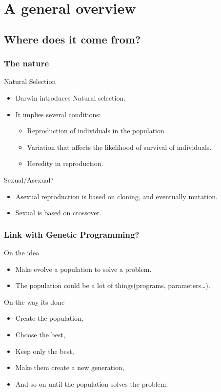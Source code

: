 \section{A general overview}
\subsection{Where does it come from?}

\begin{frame}
  \frametitle{The nature}
  \begin{block}{Natural Selection}
    \begin{itemize}
    \item Darwin\cite{darwin.1840.origin.of.species} introduces
      Natural selection.
    \item It implies several conditions:
      \begin{itemize}
      \item Reproduction of individuals in the population.
      \item Variation that affects the likelihood of survival of
        individuals.
      \item Heredity in reproduction.
      \end{itemize}
    \end{itemize}
  \end{block}

  \begin{block}{Sexual/Asexual?}
    \begin{itemize}
    \item Asexual reproduction is based on cloning, and
      eventually mutation.
    \item Sexual is based on crossover.
    \end{itemize}
  \end{block}
\end{frame}

\begin{frame}
  \frametitle{Link with Genetic Programming?}
  \begin{block}{On the idea}
    \begin{itemize}
    \item Make evolve a population to solve a problem.
    \item The population could be a lot of things(programs, parameters\dots).
    \end{itemize}
  \end{block}

  \begin{block}{On the way its done}
    \begin{itemize}
    \item Create the population,
    \item Choose the best,
    \item Keep only the best,
    \item Make them create a new generation,
    \item And so on until the population solves the problem.
    \end{itemize}
  \end{block}
\end{frame}



